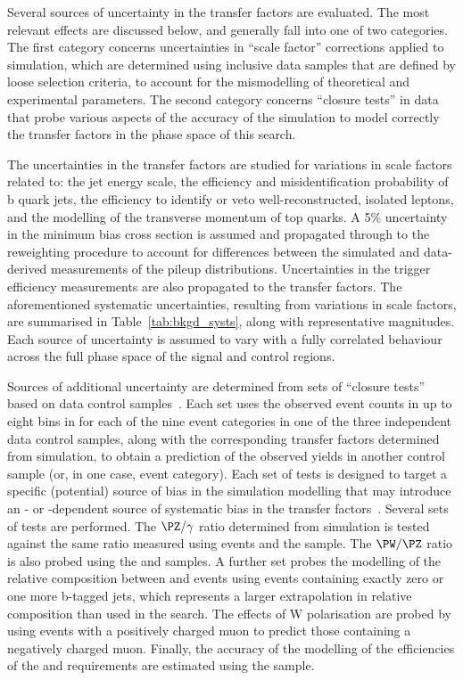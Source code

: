 Several sources of uncertainty in the transfer factors are evaluated.
The most relevant effects are discussed below, and generally fall into
one of two categories. The first category concerns uncertainties in
``scale factor'' corrections applied to simulation, which are
determined using inclusive data samples that are defined by loose
selection criteria, to account for the mismodelling of theoretical and
experimental parameters. The second category concerns ``closure
tests'' in data that probe various aspects of the accuracy of the
simulation to model correctly the transfer factors in the phase space
of this search.

The uncertainties in the transfer factors are studied for variations
in scale factors related to: the jet energy scale, the efficiency and
misidentification probability of b quark jets, the efficiency to
identify or veto well-reconstructed, isolated leptons, and the
modelling of the transverse momentum of top quarks.%
A 5\% uncertainty in the minimum bias cross section is assumed and
propagated through to the reweighting procedure to account for
differences between the simulated and data-derived measurements of the
pileup distributions.  Uncertainties in the trigger efficiency
measurements are also propagated to the transfer factors.  The
aforementioned systematic uncertainties, resulting from variations in
scale factors, are summarised in Table~\ref{tab:bkgd_systs}, along
with representative magnitudes.  Each source of uncertainty is assumed
to vary with a fully correlated behaviour across the full phase space
of the signal and control regions.

Sources of additional uncertainty are determined from sets of
``closure tests'' based on data control
samples~\cite{RA1Paper2012}. Each set uses the observed event counts
in up to eight bins in \scalht for each of the nine \njet event
categories in one of the three independent data control samples, along
with the corresponding transfer factors determined from simulation, to
obtain a prediction of the observed yields in another control sample
(or, in one case, \nb event category). 
Each set of tests is designed to target a specific (potential) source
of bias in the simulation modelling that may introduce an \njet- or
\scalht-dependent source of systematic bias in the transfer
factors~\cite{RA1Paper2012}. Several sets of tests are performed. The
$\PZ/\gamma$ ratio determined from simulation is tested against the
same ratio measured using \zmmj events and the \gj sample. The
$\PW/\PZ$ ratio is also probed using the \mj and \mmj samples. A
further set probes the modelling of the relative composition between
\wlj and \ttbar events using \mj events containing exactly zero or one
more b-tagged jets, which represents a larger extrapolation in
relative composition than used in the search.  The effects of W
polarisation are probed by using \mj events with a positively charged
muon to predict those containing a negatively charged muon. Finally,
the accuracy of the modelling of the efficiencies of the \alphat and
\bdphi requirements are estimated using the \mj sample.

